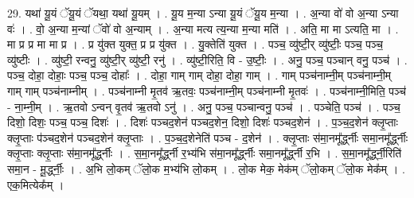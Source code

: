 \documentclass[17pt]{extarticle}
\begin{document}
29. यथा॑ यू॒यं ॅयू॒यं ॅयथा॒ यथा॑ यू॒यम् । . यू॒य म॒न्या ऽन्या यू॒यं ॅयू॒य म॒न्या । . अ॒न्या वो॑ वो अ॒न्या ऽन्या वः॑ । . वो॒ अ॒न्या म॒न्यां ॅवो॑ वो अ॒न्याम् । . अ॒न्या मत्य त्य॒न्या म॒न्या मति॑ । . अति॒ मा मा ऽत्यति॒ मा । . मा प्र प्र मा मा प्र । . प्र यु॑क्त युक्त॒ प्र प्र यु॑क्त । . यु॒क्तेति॑ युक्त । . पञ्च॒ व्यु॑ष्टी॒र् व्यु॑ष्टीः॒ पञ्च॒ पञ्च॒ व्यु॑ष्टीः । . व्यु॑ष्टी॒ रन्वनु॒ व्यु॑ष्टी॒र् व्यु॑ष्टी॒ रनु॑ । . व्यु॑ष्टी॒रिति॒ वि - उ॒ष्टीः॒ । . अनु॒ पञ्च॒ पञ्चान् वनु॒ पञ्च॑ । . पञ्च॒ दोहा॒ दोहाः॒ पञ्च॒ पञ्च॒ दोहाः᳚ । . दोहा॒ गाम् गाम् दोहा॒ दोहा॒ गाम् । . गाम् पञ्च॑नाम्नी॒म् पञ्च॑नाम्नी॒म् गाम् गाम् पञ्च॑नाम्नीम् । . पञ्च॑नाम्नी मृ॒तव॑ ऋ॒तवः॒ पञ्च॑नाम्नी॒म् पञ्च॑नाम्नी मृ॒तवः॑ । . पञ्च॑नाम्नी॒मिति॒ पञ्च॑ - ना॒म्नी॒म् । . ऋ॒तवो ऽन्वन् वृ॒तव॑ ऋ॒तवो ऽनु॑ । . अनु॒ पञ्च॒ पञ्चान्वनु॒ पञ्च॑ । . पञ्चेति॒ पञ्च॑ । . पञ्च॒ दिशो॒ दिशः॒ पञ्च॒ पञ्च॒ दिशः॑ । . दिशः॑ पञ्चद॒शेन॑ पञ्चद॒शेन॒ दिशो॒ दिशः॑ पञ्चद॒शेन॑ । . प॒ञ्च॒द॒शेन॑ क्लृ॒प्ताः क्लृ॒प्ताः प॑ञ्चद॒शेन॑ पञ्चद॒शेन॑ क्लृ॒प्ताः । . प॒ञ्च॒द॒शेनेति॑ पञ्च - द॒शेन॑ । . क्लृ॒प्ताः स॑मा॒नमू᳚र्द्ध्नीः समा॒नमू᳚र्द्ध्नीः क्लृ॒प्ताः क्लृ॒प्ताः स॑मा॒नमू᳚र्द्ध्नीः । . स॒मा॒नमू᳚र्द्ध्नी र॒भ्य॑भि स॑मा॒नमू᳚र्द्ध्नीः समा॒नमू᳚र्द्ध्नी र॒भि । . स॒मा॒नमू᳚र्द्ध्नी॒रिति॑ समा॒न - मू॒र्द्ध्नीः॒ । . अ॒भि लो॒कम् ॅलो॒क म॒भ्य॑भि लो॒कम् । . लो॒क मेक॒ मेक॑म् ॅलो॒कम् ॅलो॒क मेक᳚म् । . एक॒मित्येक᳚म् । \newline
\end{document}
